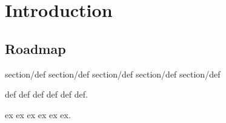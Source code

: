 \chapter{Introduction}

\section{Roadmap}

\begin{definition}
section/def section/def section/def
section/def section/def
\end{definition}

\begin{group}
  
\begin{definition}
  def def def
  def
  def def.

\end{definition}

\begin{example}
  ex ex ex
  ex
  ex ex.

\end{example}
\end{group}
